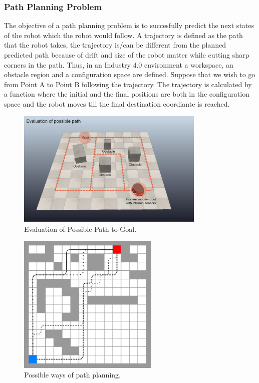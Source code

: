 \subsubsection{Path Planning Problem}
The objective of a path planning problem is to succesfully predict the next states of the robot which the robot would follow. A trajectory is defined as the path that the robot takes, the trajectory is/can be different from the planned predicted path because of drift and size of the robot matter while cutting sharp corners in the path.
Thus, in an Industry 4.0 environment a workspace, an obstacle region and a configuration space are defined. Suppose that we wish to go from Point A to Point B following the trajectory. The trajectory is calculated by a function where the initial and the final positions are both in the configuration space and the robot moves till the final destination coordiante is reached.

\begin{figure}[th]
\centering
\includegraphics[width=0.8\textwidth]{Figures/path-planning-to-goal.jpg}
\decoRule
\caption[]{Evaluation of Possible Path to Goal.}
\label{fig:Path Planning}
\end{figure}

\begin{figure}[th]
    \centering
    \includegraphics[width=0.6\textwidth]{Figures/14x14_grid_paths.png}
    \decoRule
    \caption{Possible ways of path planning.}
    \label{fig: Grid Paths}
\end{figure}

